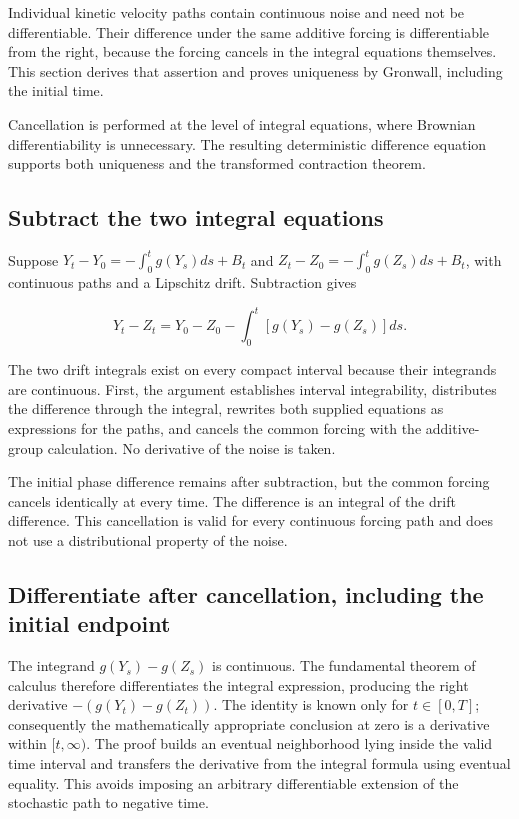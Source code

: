 \documentclass[11pt,a4paper]{report}
\begin{document}
Individual kinetic velocity paths contain continuous noise and need not be differentiable. Their difference under the same additive forcing is differentiable from the right, because the forcing cancels in the integral equations themselves. This section derives that assertion and proves uniqueness by Gronwall, including the initial time.



Cancellation is performed at the level of integral equations, where Brownian differentiability is unnecessary. The resulting deterministic difference equation supports both uniqueness and the transformed contraction theorem.

\subsection{\texorpdfstring{Subtract the two integral equations}{Subtract the two integral equations}}
\label{report-step-KineticLangevin-IntegralCoupling-lean-1}


Suppose \(Y_t-Y_0=-\int_0^t g(Y_s)ds+B_t\) and \(Z_t-Z_0=-\int_0^t g(Z_s)ds+B_t\), with continuous paths and a Lipschitz drift. Subtraction gives

\[Y_t-Z_t=Y_0-Z_0-\int_0^t[g(Y_s)-g(Z_s)]ds.\]

The two drift integrals exist on every compact interval because their integrands are continuous. First, the argument establishes interval integrability, distributes the difference through the integral, rewrites both supplied equations as expressions for the paths, and cancels the common forcing with the additive-group calculation. No derivative of the noise is taken.



The initial phase difference remains after subtraction, but the common forcing cancels identically at every time. The difference is an integral of the drift difference. This cancellation is valid for every continuous forcing path and does not use a distributional property of the noise.

\subsection{\texorpdfstring{Differentiate after cancellation, including the initial endpoint}{Differentiate after cancellation, including the initial endpoint}}
\label{report-step-KineticLangevin-IntegralCoupling-lean-2}


The integrand \(g(Y_s)-g(Z_s)\) is continuous. The fundamental theorem of calculus therefore differentiates the integral expression, producing the right derivative \(-(g(Y_t)-g(Z_t))\). The identity is known only for \(t\in[0,T]\); consequently the mathematically appropriate conclusion at zero is a derivative within \([t,\infty)\). The proof builds an eventual neighborhood lying inside the valid time interval and transfers the derivative from the integral formula using eventual equality. This avoids imposing an arbitrary differentiable extension of the stochastic path to negative time.
\end{document}
